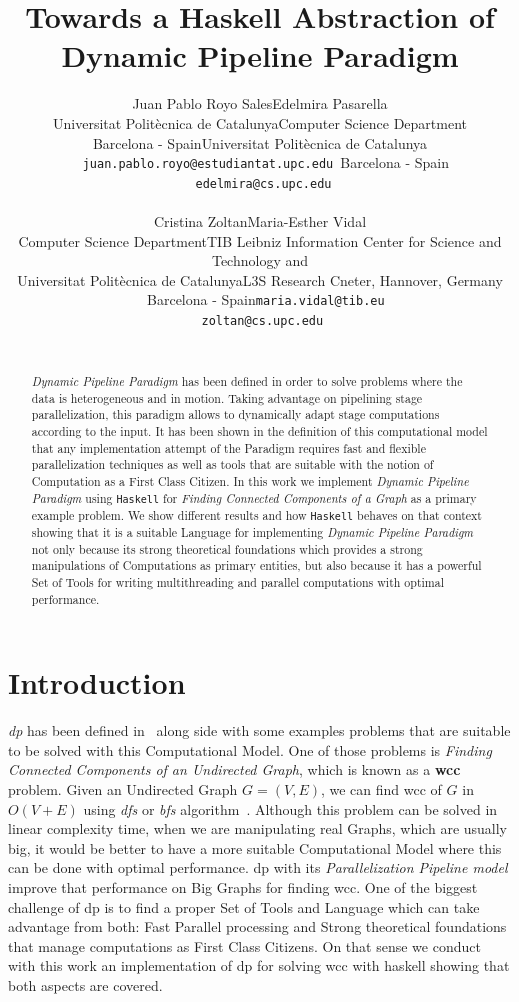 \documentclass[12pt]{article}
\title{Towards a Haskell Abstraction of Dynamic Pipeline Paradigm}
\author{
\begin{tabular}{c c}       
      \normalsize{Juan Pablo Royo Sales} & \normalsize{Edelmira Pasarella}\\ 
      \footnotesize{Universitat Politècnica de Catalunya} & \footnotesize{Computer Science Department}\\
      \footnotesize{Barcelona - Spain} & \footnotesize{Universitat Politècnica de Catalunya}\\ 
      \footnotesize{\texttt{juan.pablo.royo@estudiantat.upc.edu}} & \footnotesize{Barcelona - Spain}\\ 
      \footnotesize{} & \footnotesize{\texttt{edelmira@cs.upc.edu}}\\\\
      \normalsize{Cristina Zoltan} & \normalsize{Maria-Esther Vidal}\\ 
      \footnotesize{Computer Science Department} & \footnotesize{TIB Leibniz Information Center for Science and Technology and}\\
      \footnotesize{Universitat Politècnica de Catalunya} & \footnotesize{L3S Research Cneter, Hannover, Germany}\\ 
      \footnotesize{Barcelona - Spain} & \footnotesize{\texttt{maria.vidal@tib.eu}}\\ 
      \footnotesize{\texttt{zoltan@cs.upc.edu}} & \footnotesize{}\\ 
\end{tabular}
}
\date{}
\begin{document}
\maketitle
\begin{abstract}
\textit{Dynamic Pipeline Paradigm} has been defined in order to solve problems where the data is heterogeneous 
and in motion. Taking advantage on pipelining stage parallelization, this paradigm allows to dynamically adapt 
stage computations according to the input. It has been shown in the definition of this computational model that any
implementation attempt of the Paradigm requires fast and flexible parallelization techniques as well as tools that 
are suitable with the notion of Computation as a First Class Citizen. In this work we implement \textit{Dynamic Pipeline Paradigm}
using \texttt{Haskell} for \textit{Finding Connected Components of a Graph} as a primary example problem. We show different results 
and how \texttt{Haskell} behaves on that context showing that it is a suitable Language for implementing \textit{Dynamic Pipeline Paradigm} 
not only because its strong theoretical foundations which provides a strong manipulations of Computations as primary entities, but also because it has a powerful 
Set of Tools for writing multithreading and parallel computations with optimal performance.
\end{abstract}

\section{Introduction}
\textit{\acrfull{dp}} has been defined in~\cite{dp_def} along side with some examples problems that are suitable to be solved with this Computational Model.
One of those problems is \textit{Finding Connected Components of an Undirected Graph}, which is known as a \textbf{\acrfull{wcc}} problem. 
Given an Undirected Graph $G = (V, E)$, we can find \acrshort{wcc} of $G$ in $O(V + E)$ using \textit{\acrfull{dfs}} or \textit{\acrfull{bfs}} algorithm~\cite{CormenLeisersonEtAl09}. 
Although this problem can be solved in linear complexity time, when we are manipulating real Graphs, which are usually big, it would be better to have a more suitable Computational Model where this can be done with
optimal performance. \acrshort{dp} with its \textit{Parallelization Pipeline model} improve that performance on Big Graphs for finding \acrshort{wcc}.
One of the biggest challenge of \acrshort{dp} is to find a proper Set of Tools and Language which can take advantage from both: Fast Parallel processing and Strong theoretical foundations that manage computations as First Class Citizens. 
On that sense we conduct with this work an implementation of \acrshort{dp} for solving \acrshort{wcc} with \acrfull{haskell} showing that both aspects are covered.
\end{document}
